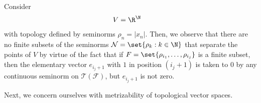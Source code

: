 \documentclass[10pt]{mypackage}
\begin{document}
\begin{example}
  Consider
  \begin{align*}
    V &= \R^{\N}
  \end{align*}
  with topology defined by seminorms $\rho_n = \left\vert x_n \right\vert$. Then, we observe that there are no finite subsets of the seminorms $ \mathcal{N} = \set{\rho_k : k\in \N} $ that separate the points of $V$ by virtue of the fact that if $F = \set{\rho_{i_1},\dots,\rho_{i_j}}$ is a finite subset, then the elementary vector $e_{i_j + 1}$ with $1$ in position $\left( i_j + 1 \right)$ is taken to $0$ by any continuous seminorm on $ \mathcal{T}\left( \mathcal{F} \right) $, but $e_{i_j + 1}$ is not zero.
\end{example}
Next, we concern ourselves with metrizability of topological vector spaces.
\end{document}

